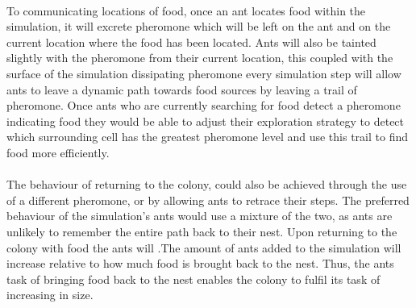 \documentclass[main.tex]{subfiles}
\begin{document}
\paragraph{}To communicating locations of food, once an ant locates food within the simulation, it will excrete pheromone which will be left on the ant and on the current location where the food has been located. Ants will also be tainted slightly with the pheromone from their current location, this coupled with the surface of the simulation dissipating pheromone every simulation step will allow ants to leave a dynamic path towards food sources by leaving a trail of pheromone. Once ants who are currently searching for food detect a pheromone indicating food they would be able to adjust their exploration strategy to detect which surrounding cell has the greatest pheromone level and use this trail to find food more efficiently.

\paragraph{}The behaviour of returning to the colony, could also be achieved through the use of a different pheromone, or by allowing ants to retrace their steps. The preferred behaviour of the simulation's ants would use a mixture of the two, as ants are unlikely to remember the entire path back to their nest. Upon returning to the colony with food the ants will .The amount of ants added to the simulation will increase relative to how much food is brought back to the nest. Thus, the ants task of bringing food back to the nest enables the colony to fulfil its task of increasing in size.
\end{document}
